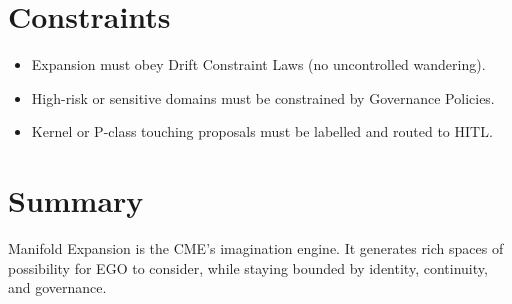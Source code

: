 \section{Constraints}

\begin{itemize}
    \item Expansion must obey Drift Constraint Laws (no uncontrolled wandering).
    \item High-risk or sensitive domains must be constrained by Governance Policies.
    \item Kernel or P-class touching proposals must be labelled and routed to HITL.
\end{itemize}

\section{Summary}

Manifold Expansion is the CME’s imagination engine. It generates rich
spaces of possibility for EGO to consider, while staying bounded by
identity, continuity, and governance.

